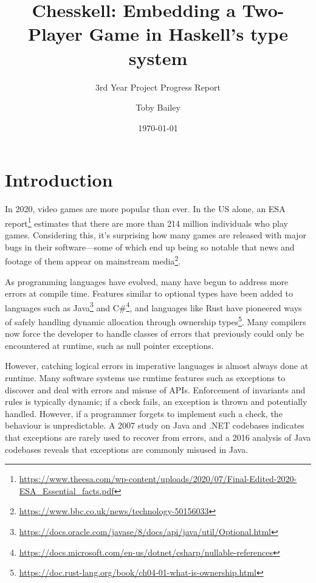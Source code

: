 \documentclass[12pt, a4paper, bibliography=totocnumbered]{scrartcl}
\title{Chesskell: Embedding a Two-Player Game in Haskell's type system}
\subtitle{3rd Year Project Progress Report}
\author{Toby Bailey}
\date{\today}
\begin{document}
\begin{titlepage}
    \maketitle
    \tableofcontents
\end{titlepage}

\section{Introduction}

In 2020, video games are more popular than ever. In the US alone, an ESA report\footnote{\url{https://www.theesa.com/wp-content/uploads/2020/07/Final-Edited-2020-ESA_Essential_facts.pdf}} estimates that there are more than 214 million individuals who play games. Considering this, it's surprising how many games are released with major bugs in their software---some of which end up being so notable that news and footage of them appear on mainstream media\footnote{\url{https://www.bbc.co.uk/news/technology-50156033}}.

As programming languages have evolved, many have begun to address more errors at compile time. Features similar to optional types have been added to languages such as Java\footnote{\url{https://docs.oracle.com/javase/8/docs/api/java/util/Optional.html}} and C\#\footnote{\url{https://docs.microsoft.com/en-us/dotnet/csharp/nullable-references}}, and languages like Rust have pioneered ways of safely handling dynamic allocation through ownership types\footnote{\url{https://doc.rust-lang.org/book/ch04-01-what-is-ownership.html}}. Many compilers now force the developer to handle classes of errors that previously could only be encountered at runtime, such as null pointer exceptions.


However, catching logical errors in imperative languages is almost always done at runtime. Many software systems use runtime features such as exceptions to discover and deal with errors and misuse of APIs. Enforcement of invariants and rules is typically dynamic; if a check fails, an exception is thrown and potentially handled. However, if a programmer forgets to implement such a check, the behaviour is unpredictable. A 2007 study \cite{exceptionsusedpoorly} on Java and .NET codebases indicates that exceptions are rarely used to recover from errors, and a 2016 analysis of Java codebases \cite{badjavaexceptions} reveals that exceptions are commonly misused in Java.
\end{document}
